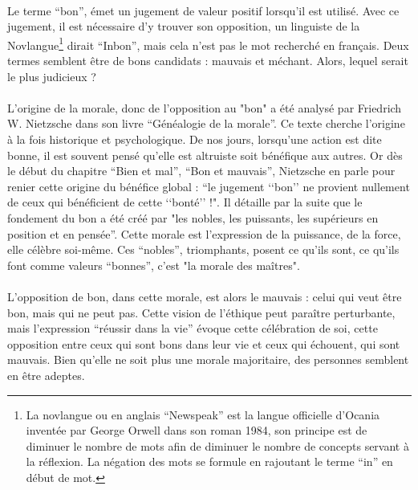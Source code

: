 \documentclass[10pt, french, a4paper]{report}
\begin{document}
\paragraph{}
Le terme ``bon'', émet un jugement de valeur positif lorsqu’il est utilisé. Avec ce jugement, il est nécessaire d’y trouver son opposition, un linguiste de la Novlangue\footnote{La novlangue ou en anglais ``Newspeak'' est la langue officielle d’Ocania inventée par George Orwell dans son roman 1984, son principe est de diminuer le nombre de mots afin de diminuer le nombre de concepts servant à la réflexion. La négation des mots se formule en rajoutant le terme ``in'' en début de mot.} dirait ``Inbon'', mais cela n’est pas le mot recherché en français. Deux termes semblent être de bons candidats : mauvais et méchant. Alors, lequel serait le plus judicieux ?

\paragraph{}
L’origine de la morale, donc de l’opposition au "bon" a été analysé par Friedrich W. Nietzsche \citep{nietzsche_genealogie_1900} dans son livre ``Généalogie de la morale''. Ce texte cherche l’origine à la fois historique et psychologique. De nos jours, lorsqu’une action est dite bonne, il est souvent pensé qu’elle est altruiste soit bénéfique aux autres. Or dès le début du chapitre ``Bien et mal'', ``Bon et mauvais'', Nietzsche en parle pour renier cette origine du bénéfice global : ``le jugement ‘‘bon’’ ne provient nullement de ceux qui bénéficient de cette ‘‘bonté’’ !". Il détaille par la suite que le fondement du bon a été créé par "les nobles, les puissants, les supérieurs en position et en pensée''. Cette morale est l’expression de la puissance, de la force, elle célèbre soi-même. Ces ``nobles'', triomphants, posent ce qu’ils sont, ce qu’ils font comme valeurs ``bonnes'', c’est "la morale des maîtres".

\paragraph{}
L’opposition de bon, dans cette morale, est alors le mauvais : celui qui veut être bon, mais qui ne peut pas. Cette vision de l’éthique peut paraître perturbante, mais l’expression ``réussir dans la vie'' évoque cette célébration de soi, cette opposition entre ceux qui sont bons dans leur vie et ceux qui échouent, qui sont mauvais. Bien qu’elle ne soit plus une morale majoritaire, des personnes semblent en être adeptes.
\end{document}
